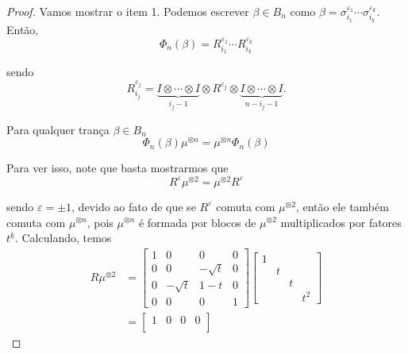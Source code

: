 \documentclass[a4paper,portuguese,11pt,twoside, leqno]{book}
\theoremstyle{definition}
\begin{document}
	\begin{proof}
		Vamos mostrar o item 1. Podemos escrever $\beta\in B_n$ como $\beta = \sigma_{i_1}^{\varepsilon_1}\cdots\sigma_{i_k}^{\varepsilon_k}$. Então,
		\begin{equation*}
		\Phi_n(\beta) = R_{i_1}^{\varepsilon_1}\cdots R_{i_k}^{\varepsilon_k}
		\end{equation*}
		\par\vspace{0.3cm} sendo 
		\begin{equation*}
		R_{i_j}^{\varepsilon_j} = \underbrace{I\otimes \cdots \otimes I}_{i_j - 1}\otimes R^{\varepsilon_j}\otimes \underbrace{I\otimes \cdots\otimes I}_{n-i_j-1}.
		\end{equation*} 
		\par\vspace{0.3cm} Para qualquer trança $\beta\in B_n$
		\begin{equation*}
		\Phi_n(\beta)\mu^{\otimes n} = \mu^{\otimes n}\Phi_n(\beta)
		\end{equation*}
		\par\vspace{0.3cm} Para ver isso, note que basta mostrarmos que
		\begin{equation}
		\label{R mi duas vezes}
		R^{\varepsilon}\mu^{\otimes 2} = \mu^{\otimes 2}R^{\varepsilon}
		\end{equation}
		\par\vspace{0.3cm} sendo $\varepsilon=\pm1$, devido ao fato de que se $R^{\varepsilon}$ comuta com $\mu^{\otimes 2}$, então ele também comuta com $\mu^{\otimes n}$, pois $\mu^{\otimes n}$ é formada por blocos de $\mu^{\otimes 2}$ multiplicados por fatores $t^k$. Calculando, temos
		\begin{align*}
		R\mu^{\otimes 2} &= \begin{bmatrix}
		1 & 0 & 0 & 0 \\
		0 & 0 & -\sqrt{t} & 0 \\
		0 & -\sqrt{t} & 1-t & 0 \\
		0 & 0 & 0 & 1
		\end{bmatrix}\begin{bmatrix}
		1 \\
		& t \\
		& & t \\
		& & & t^2
		\end{bmatrix} \\
		&= \begin{bmatrix}
		1 & 0 & 0 & 0 \\

\end{bmatrix}
\end{align*}
\end{proof}
\end{document}
